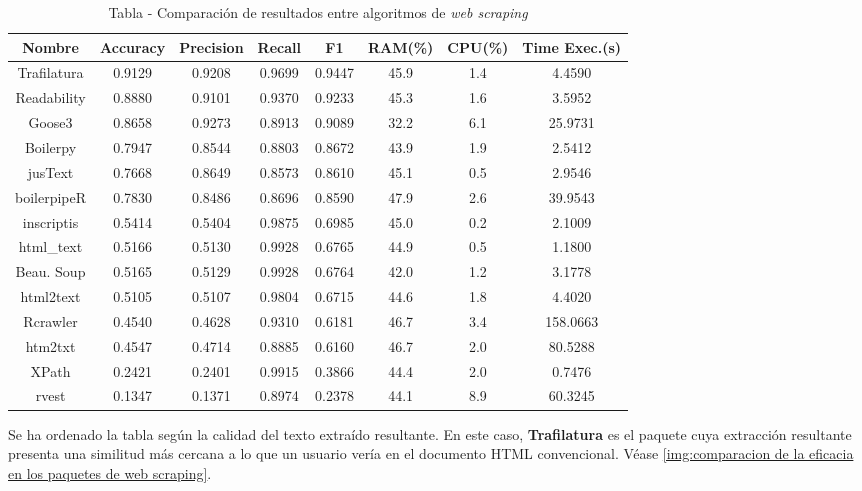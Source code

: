 \begin{table}[h]
    \begin{center}
      \begin{tabular}{| c | c | c | c | c | c | c | c |} \hline 
       \textbf{Nombre} & \textbf{Accuracy} & \textbf{Precision}  & \textbf{Recall} & \textbf{F1} & \textbf{RAM(\%)} & \textbf{CPU(\%)} & \textbf{Time Exec.(s)} \\ \hline
       Trafilatura & 0.9129 & 0.9208 & 0.9699 & 0.9447 & 45.9 & 1.4 & 4.4590 \\ \hline
       Readability & 0.8880 & 0.9101 & 0.9370 & 0.9233 & 45.3 & 1.6 & 3.5952 \\ \hline
       Goose3 & 0.8658 & 0.9273 & 0.8913 & 0.9089 & 32.2 & 6.1 & 25.9731 \\ \hline
       Boilerpy & 0.7947 & 0.8544 & 0.8803 & 0.8672 & 43.9 & 1.9 & 2.5412 \\ \hline
       jusText & 0.7668 & 0.8649 & 0.8573 & 0.8610 & 45.1 & 0.5 & 2.9546 \\ \hline
       boilerpipeR & 0.7830 & 0.8486 & 0.8696 & 0.8590 & 47.9 & 2.6 & 39.9543 \\ \hline
       inscriptis & 0.5414 & 0.5404 & 0.9875 & 0.6985 & 45.0 & 0.2 & 2.1009 \\ \hline
       html\_text & 0.5166 & 0.5130 & 0.9928 & 0.6765 & 44.9 & 0.5 & 1.1800 \\ \hline
       Beau. Soup & 0.5165 & 0.5129 & 0.9928 & 0.6764 & 42.0 & 1.2 & 3.1778 \\ \hline
       html2text & 0.5105 & 0.5107 & 0.9804 & 0.6715 & 44.6 & 1.8 & 4.4020 \\ \hline
       Rcrawler & 0.4540 & 0.4628 & 0.9310 & 0.6181 & 46.7 & 3.4 & 158.0663 \\ \hline
       htm2txt & 0.4547 & 0.4714 & 0.8885 & 0.6160 & 46.7 & 2.0 & 80.5288 \\ \hline
       XPath & 0.2421 & 0.2401 & 0.9915 & 0.3866 & 44.4 & 2.0 & 0.7476 \\ \hline
       rvest & 0.1347 & 0.1371 & 0.8974 & 0.2378 & 44.1 & 8.9 & 60.3245 \\ \hline
      \end{tabular}
      \caption{Tabla - Comparación de resultados entre algoritmos de \emph{web scraping}}
      \label{tab:tabla - comparacion de resultados entre algoritmos de web scraping}
    \end{center}
\end{table}

Se ha ordenado la tabla según la calidad del texto extraído resultante. En este caso, \textbf{Trafilatura}
es el paquete cuya extracción resultante presenta una similitud más cercana a lo que un usuario vería en
el documento HTML convencional. Véase \ref{img:comparacion de la eficacia en los paquetes de web scraping}.

